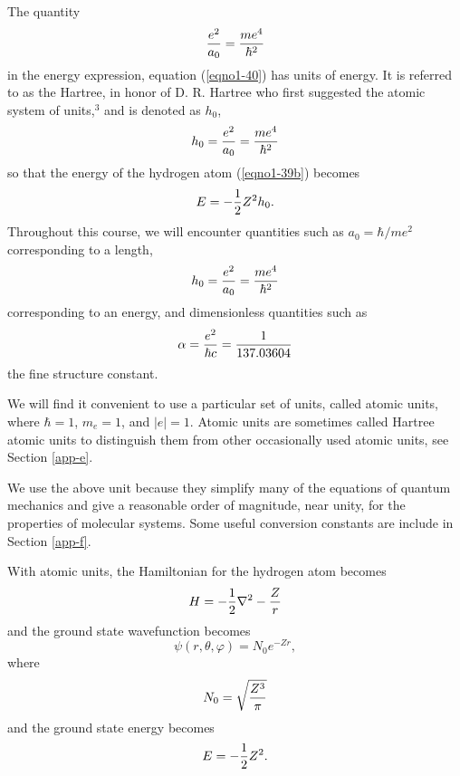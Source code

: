 The quantity
\begin{equation}
{e^2 \over a_0} = {me^4 \over \hbar^2} 
\end{equation}
in the energy expression, equation (\ref{eqno1-40}) has units of
energy. It is referred to as the Hartree, in honor of D. R. Hartree
who first suggested the atomic system of units,$^3$ and is denoted as
$h_0$,
\begin{equation}
h_0 = {e^2 \over a_0} = {me^4 \over \hbar^2} 
\end{equation}
so that the energy of the hydrogen atom (\ref{eqno1-39b}) becomes
\begin{equation}
E = - {1 \over 2} Z^2 h_0.
\end{equation}
Throughout this course, we will encounter quantities such as $a_0 = 
\hbar/me^2$ corresponding to a length,
\begin{equation}
h_0 = {e^2 \over a_0} = {me^4 \over \hbar^2} 
\end{equation}
corresponding to an energy, and dimensionless quantities such as
\begin{equation}
\alpha = {e^2 \over \hbar c} = { 1 \over 137.03604}
\end{equation}
the fine structure constant.

We will find it convenient to use a particular set of units, called 
atomic units, where $\hbar = 1$, $m_e = 1$, and $|e| = 1$.  Atomic units 
are sometimes called Hartree atomic units to distinguish
them from other occasionally used atomic units, see Section \ref{app-e}.

We use the above unit because they simplify many of the equations of quantum
mechanics and give a reasonable order of magnitude, near unity, for the properties of
molecular systems. Some useful conversion constants are include in
Section \ref{app-f}.

With atomic units, the Hamiltonian for the hydrogen atom becomes
\begin{equation}
H = - {1 \over 2} \nabla^2 - {Z \over r}
\end{equation}
and the ground state wavefunction becomes
\begin{equation}
\psi ( r, \theta, \varphi ) = N_0 e^{-Zr},
\label{eqno1-41}
\end{equation}
where
\begin{equation}
N_0 = \sqrt{{Z^3 \over \pi}}
\end{equation}
and the ground state energy becomes
\begin{equation}
E = - {1 \over 2} Z^2.
\end{equation}

